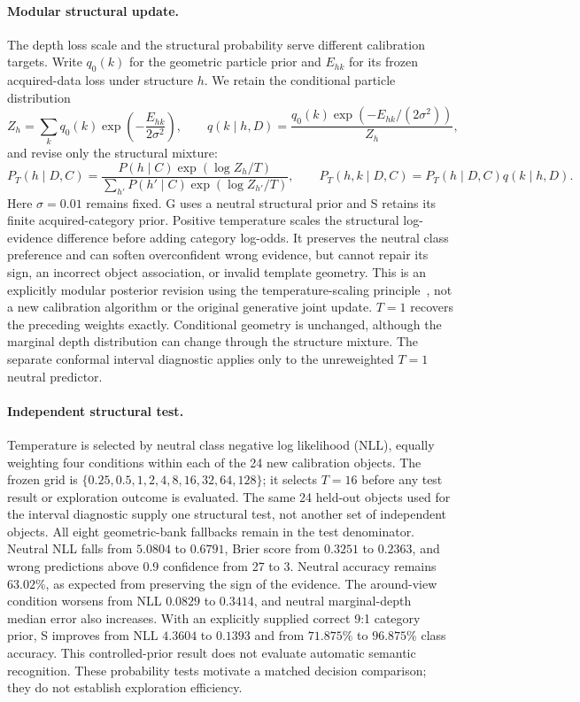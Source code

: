 \paragraph{Modular structural update.}
The depth loss scale and the structural probability serve different calibration targets. Write $q_0(k)$ for the geometric particle prior and $E_{hk}$ for its frozen acquired-data loss under structure $h$. We retain the conditional particle distribution
\[
Z_h=\sum_k q_0(k)\exp\!\left(-\frac{E_{hk}}{2\sigma^2}\right),\qquad
q(k\mid h,D)=\frac{q_0(k)\exp(-E_{hk}/(2\sigma^2))}{Z_h},
\]
and revise only the structural mixture:
\[
P_T(h\mid D,C)=\frac{P(h\mid C)\exp(\log Z_h/T)}{\sum_{h'}P(h'\mid C)\exp(\log Z_{h'}/T)},\qquad
P_T(h,k\mid D,C)=P_T(h\mid D,C)q(k\mid h,D).
\]
Here $\sigma=0.01$ remains fixed. G uses a neutral structural prior and S retains its finite acquired-category prior. Positive temperature scales the structural log-evidence difference before adding category log-odds. It preserves the neutral class preference and can soften overconfident wrong evidence, but cannot repair its sign, an incorrect object association, or invalid template geometry. This is an explicitly modular posterior revision using the temperature-scaling principle~\cite{pmlr-v70-guo17a}, not a new calibration algorithm or the original generative joint update. $T=1$ recovers the preceding weights exactly. Conditional geometry is unchanged, although the marginal depth distribution can change through the structure mixture. The separate conformal interval diagnostic applies only to the unreweighted $T=1$ neutral predictor.

\paragraph{Independent structural test.}
Temperature is selected by neutral class negative log likelihood (NLL), equally weighting four conditions within each of the 24 new calibration objects. The frozen grid is $\{0.25,0.5,1,2,4,8,16,32,64,128\}$; it selects $T=16$ before any test result or exploration outcome is evaluated. The same 24 held-out objects used for the interval diagnostic supply one structural test, not another set of independent objects. All eight geometric-bank fallbacks remain in the test denominator. Neutral NLL falls from $5.0804$ to $0.6791$, Brier score from $0.3251$ to $0.2363$, and wrong predictions above 0.9 confidence from 27 to 3. Neutral accuracy remains $63.02\%$, as expected from preserving the sign of the evidence. The around-view condition worsens from NLL $0.0829$ to $0.3414$, and neutral marginal-depth median error also increases. With an explicitly supplied correct 9:1 category prior, S improves from NLL $4.3604$ to $0.1393$ and from $71.875\%$ to $96.875\%$ class accuracy. This controlled-prior result does not evaluate automatic semantic recognition. These probability tests motivate a matched decision comparison; they do not establish exploration efficiency.



